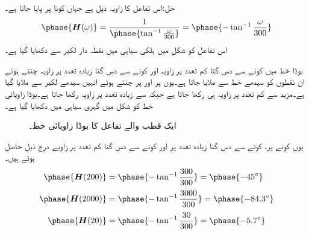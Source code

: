 حل:اس تفاعل کا زاویہ ذیل ہے جہاں کونا  پر پایا جاتا ہے۔
\begin{align}
\phase{\bH(\omega)}=\frac{1}{\phase{\tan^{-1} \frac{\omega}{300}}}=\phase{-\tan^{-1}\frac{\omega}{300}}
\end{align}
اس تفاعل کو شکل  میں ہلکی سیاہی میں نقطہ دار لکیر سے دکھایا گیا ہے۔

بوڈا خط میں کونے سے دس گنا کم تعدد پر زاویہ  اور کونے سے دس گنا زیادہ تعدد پر زاویہ  چنتے ہوئے ان نقطوں کو سیدھے خط سے ملایا جاتا ہے۔یوں  پر  اور   پر  چنتے ہوئے انہیں سیدھے لکیر سے ملایا گیا ہے۔مزید   سے کم تعدد پر زاویہ  ہی رکھا جاتا ہے جبکہ  سے زیادہ تعدد پر زاویہ  رکھا جاتا ہے۔بوڈا زاویائی خط کو شکل   میں گہری سیاہی میں دکھایا گیا ہے۔
\begin{figure}
\centering
{}
\caption{ایک قطب والے تفاعل کا بوڈا زاویائی خط۔}
\label{شکل_تعددی_زاویائی_بوڈا_ایک_قطب_الف}
\end{figure}

یوں کونے  پر، کونے سے دس گنا زیادہ تعدد  پر اور کونے سے دس گنا کم تعدد  پر زاویے درج ذیل حاصل ہوتے ہیں۔
\begin{align*}
\phase{\bH(200)}&=\phase{-\tan^{-1} \frac{300}{300}}=\phase{-45^{\circ}}\\[0.5ex]
\phase{\bH(2000)}&=\phase{-\tan^{-1} \frac{3000}{300}}=\phase{-84.3^{\circ}}\\[0.5ex]
\phase{\bH(20)}&=\phase{-\tan^{-1} \frac{30}{300}}=\phase{-5.7^{\circ}}
\end{align*}

